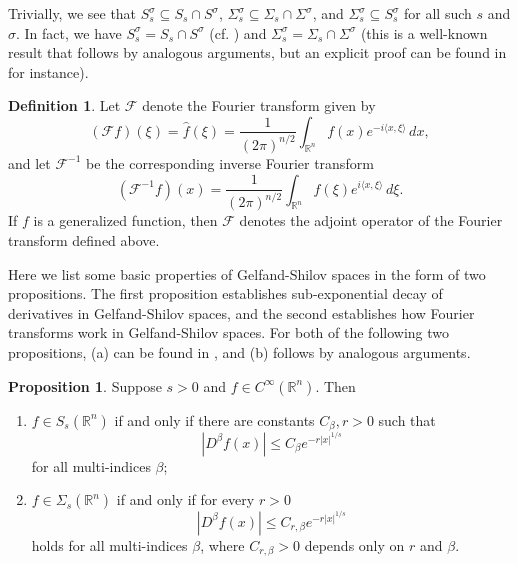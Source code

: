 \documentclass[11pt,a4paper,reqno]{amsart}
\numberwithin{equation}{section}
\theoremstyle{definition}
\newtheorem{prop}[thm]{Proposition}
\theoremstyle{definition}
\newtheorem{definition}[thm]{Definition}
\begin{document}
Trivially, we see that $S_s^\sigma \subseteq S_s\cap S^\sigma$, $\Sigma_s^\sigma \subseteq \Sigma_s \cap \Sigma^\sigma$, and $\Sigma_s^\sigma \subseteq S_s^\sigma$ for all such $s$ and $\sigma$. In fact, we have $S_s^\sigma = S_s\cap S^\sigma$ (cf. \cite{eijndhoven}) and $\Sigma_s^\sigma=\Sigma_s\cap\Sigma^\sigma$ (this is a well-known result that follows by analogous arguments, but an explicit proof can be found in \cite{albin} for instance).
\begin{definition}
 Let $\mathscr{F}$ denote the Fourier transform given by
\begin{equation*}
    (\mathscr{F}f)(\xi) = \hat{f}(\xi) = \frac{1}{(2\pi)^{n/2}} \int_{\mathbb{R}^n} f(x) e^{- i \langle x,\xi \rangle} \, dx,
\end{equation*}
and let $\mathscr{F}^{-1}$ be the corresponding inverse Fourier transform
\begin{equation*}
    (\mathscr{F}^{-1}f)(x) = \frac{1}{(2\pi)^{n/2}} \int_{\mathbb{R}^n} f(\xi) e^{i \langle x,\xi \rangle} \, d\xi.
\end{equation*}
If $f$ is a generalized function, then $\mathscr{F}$ denotes the adjoint operator of the Fourier transform defined above.
\end{definition}
Here we list some basic properties of Gelfand-Shilov spaces in the form of two propositions. The first proposition establishes sub-exponential decay of derivatives in Gelfand-Shilov spaces, and the second establishes how Fourier transforms work in Gelfand-Shilov spaces.  For both of the following two propositions, (a) can be found in \cite{eijndhoven,gel,chung}, and (b) follows by analogous arguments.
\begin{prop} \label{prop:Ssalt}
Suppose $s>0$ and $f\in C^\infty(\mathbb{R}^n)$. Then
\begin{enumerate}[label=(\alph*)]
    \item $f\in S_s(\mathbb{R}^n)$ if and only if there are constants $C_\beta,r>0$ such that
    \begin{equation}\label{eq:Ssalt}
    |D^\beta f(x)| \leq C_\beta e^{- r |x|^{1/s}}
    \end{equation}
    for all multi-indices $\beta$;
    \item $f\in\Sigma_s(\mathbb{R}^n)$ if and only if for every $r>0$
\begin{equation}\label{eq:Ssigalt}
    |D^\beta f(x)| \leq C_{r,\beta} e^{- r |x|^{1/s}}
\end{equation}
holds for all multi-indices $\beta$, where $C_{r,\beta}>0$ depends only on $r$ and $\beta$.

\end{enumerate}
\end{prop}
\end{document}
